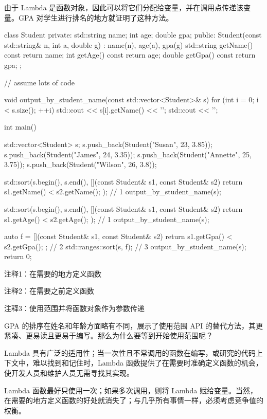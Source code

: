 由于 Lambda 是函数对象，因此可以将它们分配给变量，并在调用点传递该变量。GPA 对学生进行排名的地方就证明了这种方法。


\begin{cpp}
class Student {
private:
  std::string name;
  int age;
  double gpa;
public:
  Student(const std::string& n, int a, double g) : name(n), age(a), gpa(g) {}
  std::string getName() const { return name; }
  int getAge() const { return age; }
  double getGpa() const { return gpa; }
};

// assume lots of code

void output_by_student_name(const std::vector<Student>& s) {
  for (int i = 0; i < s.size(); ++i)
    std::cout << s[i].getName() << '\n';
  std::cout << '\n';
}

int main() {
  std::vector<Student> s;
  s.push_back(Student("Susan", 23, 3.85));
  s.push_back(Student("James", 24, 3.35));
  s.push_back(Student("Annette", 25, 3.75));
  s.push_back(Student("Wilson", 26, 3.8));

  std::sort(s.begin(), s.end(),
    [](const Student& s1, const Student& s2){
      return s1.getName() < s2.getName(); }); // 1
  output_by_student_name(s);

  std::sort(s.begin(), s.end(),
    [](const Student& s1, const Student& s2){
      return s1.getAge() < s2.getAge(); }); // 1
  output_by_student_name(s);

  auto f = [](const Student& s1, const Student& s2) {
    return s1.getGpa() < s2.getGpa(); }; // 2
  std::ranges::sort(s, f); // 3
  output_by_student_name(s);
  return 0;
}
\end{cpp}

{\footnotesize
注释1：在需要的地方定义函数

注释2：在需要之前定义函数

注释3：使用范围并将函数对象作为参数传递
}

GPA 的排序在姓名和年龄方面略有不同，展示了使用范围 API 的替代方法，其更紧凑、更易读且更易于编写。那么为什么要等到开始使用范围呢？

Lambda 具有广泛的适用性；当一次性且不常调用的函数在编写，或研究的代码上下文中，难以找到和记住时，Lambda 函数提供了在需要时准确定义函数的机会，使开发人员和维护人员无需寻找其实现。

Lambda 函数最好只使用一次；如果多次调用，则将 Lambda 赋给变量。当然，在需要的地方定义函数的好处就消失了；与几乎所有事情一样，必须考虑竞争值的权衡。

